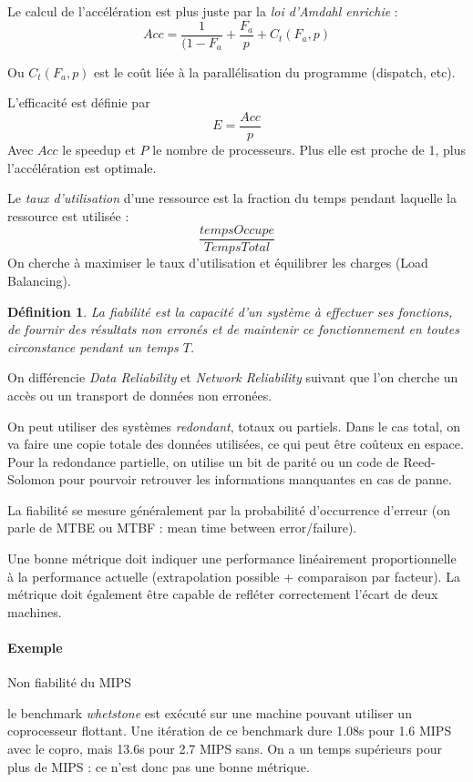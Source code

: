 \documentclass{article}
\newtheorem{defi}{Définition}
\begin{document}
Le calcul de l'accélération est plus juste par la \emph{loi d'Amdahl enrichie} :
\[Acc = \dfrac{1}{(1-F_a}+\dfrac{F_a}{p} + C_t(F_a,p)\]

Ou $C_t(F_a,p)$ est le coût liée à la parallélisation du programme (dispatch, etc).

L'efficacité est définie par
\[E=\dfrac{Acc}{p}\]
Avec $Acc$ le speedup et $P$ le nombre de processeurs.
Plus elle est proche de 1, plus l'accélération est optimale.


Le \emph{taux d'utilisation} d'une ressource est la fraction du temps pendant laquelle la ressource est utilisée :
\[\dfrac{tempsOccupe}{TempsTotal}\]
On cherche à maximiser le taux d'utilisation et équilibrer les charges (Load Balancing).


\begin{defi}
La \emph{fiabilité} est la capacité d'un système à effectuer ses fonctions, de fournir des résultats non erronés et de maintenir ce fonctionnement en toutes circonstance pendant un temps $T$.
\end{defi}

On différencie \emph{Data Reliability} et \emph{Network Reliability} suivant que l'on cherche un accès ou un transport de données non erronées.

On peut utiliser des systèmes \emph{redondant}, totaux ou partiels. Dans le cas total, on va faire une copie totale des données utilisées, ce qui peut être coûteux en espace. Pour la redondance partielle, on utilise un bit de parité ou un code de Reed-Solomon pour pourvoir retrouver les informations manquantes en cas de panne.

La fiabilité se mesure généralement par la probabilité d'occurrence d'erreur (on parle de MTBE ou MTBF : mean time between error/failure).

Une bonne métrique doit indiquer une performance linéairement proportionnelle à la performance actuelle (extrapolation possible + comparaison par facteur). La métrique doit également être capable de refléter correctement l'écart de deux machines.

\paragraph{Exemple}
Non fiabilité du MIPS

le benchmark \emph{whetstone} est exécuté sur une machine pouvant utiliser un coprocesseur flottant. Une itération de ce benchmark dure 1.08s pour 1.6 MIPS avec le copro, mais 13.6s pour 2.7 MIPS sans. On a un temps supérieurs pour plus de MIPS : ce n'est donc pas une bonne métrique.
\bigskip
\end{document}
